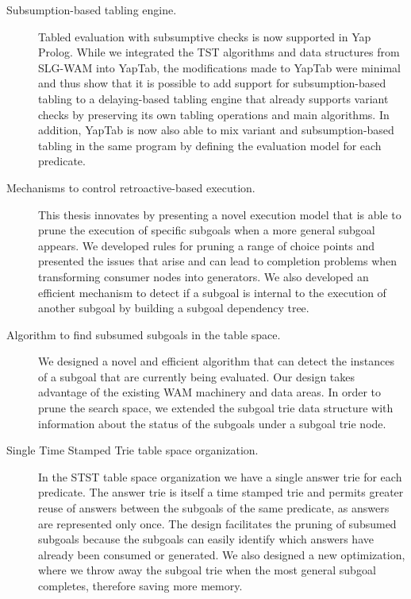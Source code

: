 \begin{description}
   \item[Subsumption-based tabling engine.] Tabled evaluation with subsumptive checks is now supported in Yap Prolog.
   While we integrated the TST algorithms and data structures from SLG-WAM into YapTab, the modifications made to
   YapTab were minimal and thus show that it is possible to add support for subsumption-based tabling to a delaying-based
   tabling engine that already supports variant checks by preserving its own tabling operations and main algorithms.
   In addition, YapTab is now also able to mix variant and subsumption-based tabling in the same program by defining
   the evaluation model for each predicate.
   
   \item[Mechanisms to control retroactive-based execution.] This thesis innovates by presenting a novel execution model
   that is able to prune the execution of specific subgoals when a more general subgoal appears. We developed rules
   for pruning a range of choice points and presented the issues that arise and can lead to completion problems when
   transforming consumer nodes into generators. We also developed an efficient mechanism to detect if a subgoal is
   internal to the execution of another subgoal by building a subgoal dependency tree.
   
   \item[Algorithm to find subsumed subgoals in the table space.] We designed a novel and efficient algorithm that
   can detect the instances of a subgoal that are currently being evaluated. Our design takes advantage of the existing
   WAM machinery and data areas. In order to prune the search space, we extended the subgoal trie data structure with
   information about the status of the subgoals under a subgoal trie node.
   
   \item[Single Time Stamped Trie table space organization.] In the STST table space organization we have a single answer
   trie for each predicate. The answer trie is itself a time stamped trie and permits greater reuse of answers between
   the subgoals of the same predicate, as answers are represented only once. The design facilitates the pruning of
   subsumed subgoals because the subgoals can easily identify which answers have already been consumed or generated.
   We also designed a new optimization, where we throw away the subgoal trie when the most general subgoal completes,
   therefore saving more memory.
   

\end{description}

